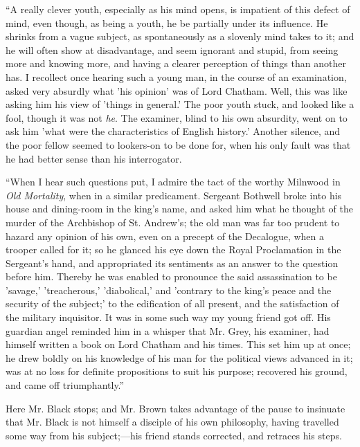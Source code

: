 ``A really clever youth, especially as his mind opens, is
impatient of this defect of mind, even though, as being a youth, he be
partially under its influence. He shrinks from a vague subject, as
spontaneously as a slovenly mind takes to it; and he will often show
at disadvantage, and seem ignorant and stupid, from seeing more and
knowing more, and having a clearer perception of things than another
has. I recollect once hearing such a young man, in the course of an
examination, asked very absurdly what 'his opinion' was of Lord
Chatham. Well, this was like asking him his view of 'things in
general.' The poor youth stuck, and looked like a fool, though it was
not \emph{he}. The examiner, blind to his own absurdity, went on
to ask him 'what were the characteristics of English history.' Another
silence, and the poor fellow seemed to lookers-on to be done for, when
his only fault was that he had better sense than his interrogator.

``When I hear such questions put, I admire the tact of the
worthy Milnwood in \emph{Old Mortality}, when in a similar
predicament. Sergeant Bothwell broke into his house and dining-room in
the king's name, and asked him what he thought of the murder of the
Archbishop of St. Andrew's; the old man was far too prudent to hazard
any opinion of his own, even on a precept of the Decalogue, when a
trooper called for it; so he glanced his eye down the Royal
Proclamation in the Sergeant's hand, and appropriated its sentiments
as an answer to the question before him. Thereby he was enabled to
pronounce the said assassination to be 'savage,' 'treacherous,'
'diabolical,' and 'contrary to the king's peace and the security of
the subject;' to the edification of all present, and the satisfaction
of the military inquisitor. It was in some such way my young friend
got off. His guardian angel reminded him in a whisper that Mr. Grey,
his examiner, had himself written a book on Lord Chatham and his
times. This set him up at once; he drew boldly on his knowledge of his
man for the political views advanced in it; was at no loss for
definite propositions to suit his purpose; recovered his ground, and
came off triumphantly.''

Here Mr. Black stops; and Mr. Brown takes advantage of the pause to
insinuate that Mr. Black is not himself a disciple of his own
philosophy, having travelled some way from his subject;—his friend
stands corrected, and retraces his steps.

